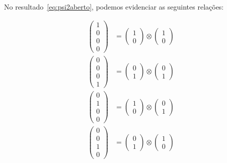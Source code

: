 No resultado~\eqref{eq:psi2aberto}, podemos evidenciar as seguintes relações:

\begin{align}\label{eq:prodtens1}
\begin{pmatrix}
1 \\
0 \\
0 \\
0
\end{pmatrix} &= \begin{pmatrix}
1 \\
0
\end{pmatrix} \otimes \begin{pmatrix}
1 \\
0
\end{pmatrix} \nonumber \\ 
\begin{pmatrix}
0 \\
0 \\
0 \\
1
\end{pmatrix} &= \begin{pmatrix}
0 \\
1
\end{pmatrix} \otimes \begin{pmatrix}
0 \\
1
\end{pmatrix} \nonumber \\ 
\begin{pmatrix}
0 \\
1 \\
0 \\
0
\end{pmatrix} &= \begin{pmatrix}
1 \\
0
\end{pmatrix} \otimes \begin{pmatrix}
0 \\
1
\end{pmatrix} \nonumber \\ 
\begin{pmatrix}
0 \\
0 \\
1 \\
0
\end{pmatrix} &= \begin{pmatrix}
0 \\
1
\end{pmatrix} \otimes \begin{pmatrix}
1 \\
0
\end{pmatrix} 
\end{align}

